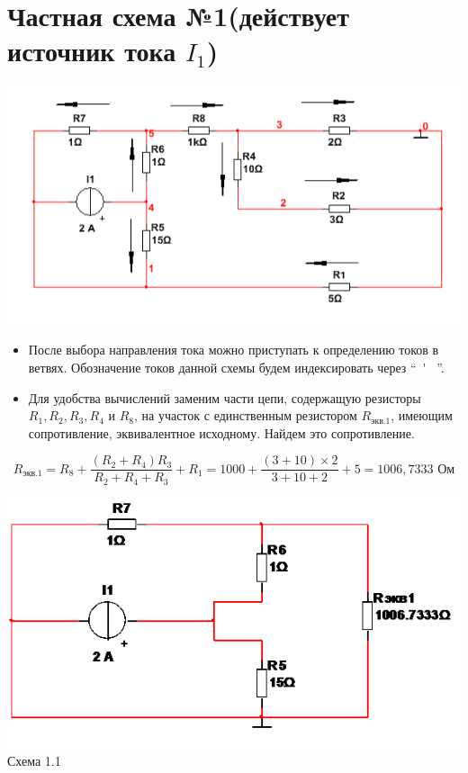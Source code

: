 \documentclass[12pt, a4paper]{report}
\begin{document}
    \section{\textbf{Частная схема №1}(действует источник тока $I_1$)}
    \begin{center}
        \includegraphics[scale = 1.2]{photo2.png}
    \end{center}
    \begin{itemize}
        \item После выбора направления тока можно приступать к определению токов в ветвях. Обозначение токов данной схемы будем индексировать через ``~\'~ ''.
        \item Для удобства вычислений заменим части цепи, содержащую резисторы $R_1, R_2, R_3, R_4$ и $R_8$, на участок с единственным резистором $R_{\text{экв.1}}$, имеющим сопротивление, эквивалентное исходному. Найдем это сопротивление.
    \end{itemize}
    \[ R_{\text{экв.1}} = R_8 + \frac{(R_2 + R_4)R_3}{R_2 + R_4 + R_3} + R_1 = 1000 + \frac{(3 + 10) \times 2}{3 + 10 + 2} + 5 = 1006,7333 \text{ Ом}   \]
    \begin{center}
        \includegraphics[scale = 1]{photo3.png}\\
        Схема 1.1
    \end{center}
\end{document}
